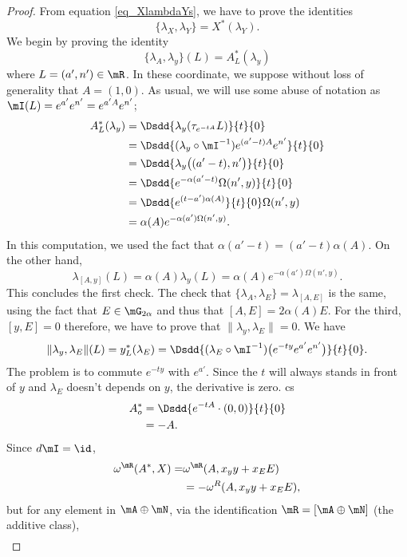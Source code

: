 \begin{proof}
From equation \eqref{eq_XlambdaYs}, we have to prove the identities
\[
  \{ \lambda_X,\lambda_Y \}=X^*(\lambda_Y).
\]
We begin by proving the identity
\[
  \{ \lambda_A,\lambda_y \}(L)=A^*_L(\lambda_y)
\]
where $L=(a',n')\in\mR$. In these coordinate, we suppose without loss of generality that $A=(1,0)$. As usual, we will use some abuse of notation as $\mI(L)= e^{a'} e^{n'}= e^{a'A} e^{n'}$;
\begin{equation}
\begin{split}
  A^*_L(\lambda_y)&=\Dsdd{ \lambda_y(\tau_{ e^{-tA}}L) }{t}{0}\\
		&=\Dsdd{ (\lambda_y\circ\mI ^{-1}) e^{(a'-t)A} e^{n'} }{t}{0}\\
		&=\Dsdd{ \lambda_y\big( (a'-t),n' \big) }{t}{0}\\
		&=\Dsdd{  e^{-\alpha(a'-t)}\Omega(n',y) }{t}{0}\\
		&=\Dsdd{  e^{(t-a')\alpha(A)} }{t}{0}\Omega(n',y)\\
		&=\alpha(A) e^{-\alpha(a')\Omega(n',y)}.
\end{split}
\end{equation}
In this computation, we used the fact that $\alpha(a'-t)=(a'-t)\alpha(A)$.
On the other hand,
\[
  \lambda_{[A,y]}(L)=\alpha(A)\lambda_y(L)=\alpha(A) e^{-\alpha(a')\Omega(n',y)}.
\]
This concludes the first check. The check that $\{ \lambda_A,\lambda_E \}=\lambda_{[A,E]}$ is the same, using the fact that $E\in\mG_{2\alpha}$ and thus that $[A,E]=2\alpha(A)E$. For the third, $[y,E]=0$ therefore, we have to prove that $\| \lambda_y,\lambda_E \|=0$. We have
\[
  \| \lambda_y,\lambda_E \|(L)=y^*_L(\lambda_E)=\Dsdd{ (\lambda_E\circ\mI^{-1})\big(  e^{-ty} e^{a'} e^{n'} \big) }{t}{0}.
\]
The problem is to commute $ e^{-ty}$ with $ e^{a'}$. Since the $t$ will always stands in front of $y$ and $\lambda_E$ doesn't depends on $y$, the derivative is zero.
cs
\[
\begin{split}
  A^*_o&=\Dsdd{  e^{-tA}\cdot(0,0) }{t}{0}\\
	&=-A.
\end{split}
\]
Since $d\mI=\id$,
\[
\begin{split}
\omega^{\mR}(A^*,X)=&\omega^{\mR}(A,x_yy+x_EE)\\
		&=-\omega^{R}(A,x_yy+x_EE),
\end{split}
\]
but for any element in $\mA\oplus\mN$, via the identification $\mR=[\mA\oplus\mN]$ (the additive class),
\[
\begin{split}

\end{split}\]
\end{proof}
